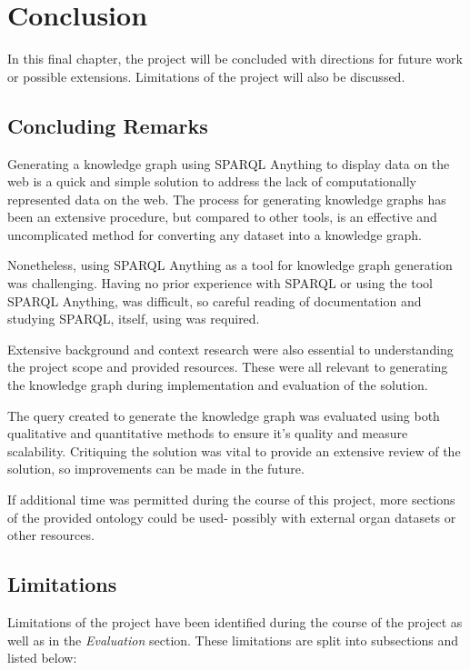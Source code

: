 \chapter{Conclusion}
In this final chapter, the project will be concluded with directions for future work or possible extensions. Limitations of the project will also be discussed. 

\section{Concluding Remarks}
\hspace{0.5cm} Generating a knowledge graph using SPARQL Anything to display data on the web is a quick and simple solution to address the lack of computationally represented data on the web. The process for generating knowledge graphs has been an extensive procedure, but compared to other tools, is an effective and uncomplicated method for converting any dataset into a knowledge graph. 

Nonetheless, using SPARQL Anything as a tool for knowledge graph generation was challenging. Having no prior experience with SPARQL or using the tool SPARQL Anything, was difficult, so careful reading of documentation \cite{sparqlanythinggithub} and studying SPARQL, itself, using \cite{sparlbook} was required. 

Extensive background and context research were also essential to understanding the project scope and provided resources. These were all relevant to generating the knowledge graph during implementation and evaluation of the solution. 

The query created to generate the knowledge graph was evaluated using both qualitative and quantitative methods to ensure it's quality and measure scalability. Critiquing the solution was vital to provide an extensive review of the solution, so improvements can be made in the future. 

If additional time was permitted during the course of this project, more sections of the provided ontology could be used- possibly with external organ datasets or other resources. 

\section{Limitations}
Limitations of the project have been identified during the course of the project as well as in the \textit{Evaluation} section. These limitations are split into subsections and listed below:

